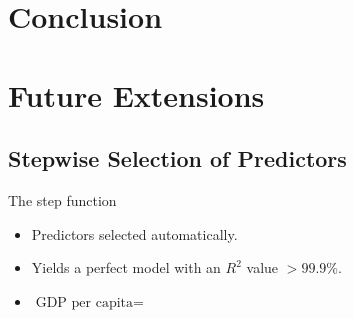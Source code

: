 \documentclass{beamer}
\begin{document}
\section{Conclusion}

\section{Future Extensions}

\subsection{Stepwise Selection of Predictors}

\begin{frame}{The step function}
\begin{itemize}
\item Predictors selected automatically.
\item Yields a perfect model with an $R^2$ value $> 99.9$\%.
\item $\textrm{GDP per capita} = $
\end{itemize}
\end{frame}
\end{document}
